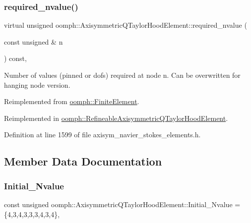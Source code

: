 \subsubsection{\texorpdfstring{required\+\_\+nvalue()}{required\_nvalue()}}
{\footnotesize\ttfamily virtual unsigned oomph\+::\+Axisymmetric\+Q\+Taylor\+Hood\+Element\+::required\+\_\+nvalue (\begin{DoxyParamCaption}\item[{const unsigned \&}]{n }\end{DoxyParamCaption}) const\hspace{0.3cm}{\ttfamily [inline]}, {\ttfamily [virtual]}}



Number of values (pinned or dofs) required at node n. Can be overwritten for hanging node version. 



Reimplemented from \hyperlink{classoomph_1_1FiniteElement_a56610c60d5bc2d7c27407a1455471b1a}{oomph\+::\+Finite\+Element}.



Reimplemented in \hyperlink{classoomph_1_1RefineableAxisymmetricQTaylorHoodElement_a3a7d2c7272f30b217c992b2c90ce8881}{oomph\+::\+Refineable\+Axisymmetric\+Q\+Taylor\+Hood\+Element}.



Definition at line 1599 of file axisym\+\_\+navier\+\_\+stokes\+\_\+elements.\+h.



\subsection{Member Data Documentation}
\mbox{\label{classoomph_1_1AxisymmetricQTaylorHoodElement_ae0826bd23cb739552135795de862c758}} 
\subsubsection{\texorpdfstring{Initial\+\_\+\+Nvalue}{Initial\_Nvalue}}
{\footnotesize\ttfamily const unsigned oomph\+::\+Axisymmetric\+Q\+Taylor\+Hood\+Element\+::\+Initial\+\_\+\+Nvalue =\{4,3,4,3,3,3,4,3,4\}\hspace{0.3cm}{\ttfamily [static]}, {\ttfamily [private]}}



